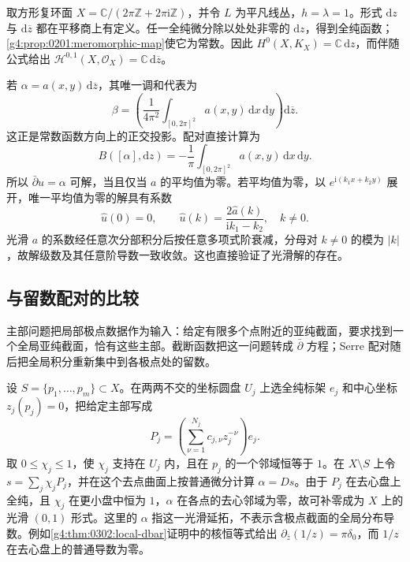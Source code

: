 \begin{example}
	\label{g4:exm:0303:flat-torus}
	取方形复环面 \(X=\mathbb C/(2\pi\mathbb Z+2\pi\mathrm{i}\mathbb Z)\)，并令 \(L\) 为平凡线丛，\(h=\lambda=1\)。形式 \(\mathrm{d}z\) 与 \(\mathrm{d}\overline z\) 都在平移商上有定义。任一全纯微分除以处处非零的 \(\mathrm{d}z\)，得到全纯函数；\cref{g4:prop:0201:meromorphic-map}使它为常数。因此 \(H^0(X,K_X)=\mathbb C\,\mathrm{d}z\)，而伴随公式给出 \(\mathscr H^{0,1}(X,\mathcal O_X)=\mathbb C\,\mathrm{d}\overline z\)。

	若 \(\alpha=a(x,y)\,\mathrm{d}\overline z\)，其唯一调和代表为
	\[
		\beta=\left(\frac1{4\pi^2}
		\int_{[0,2\pi]^2}a(x,y)\,\mathrm{d}x\,\mathrm{d}y\right)
		\mathrm{d}\overline z.
	\]
	这正是常数函数方向上的正交投影。配对直接计算为
	\[
		B([\alpha],\mathrm{d}z)
		=-\frac1\pi\int_{[0,2\pi]^2}a(x,y)\,
		\mathrm{d}x\,\mathrm{d}y.
	\]
	所以 \(\bar\partial u=\alpha\) 可解，当且仅当 \(a\) 的平均值为零。若平均值为零，以 \(e^{\mathrm{i}(k_1x+k_2y)}\) 展开，唯一平均值为零的解具有系数
	\[
		\widehat u(0)=0,\qquad
		\widehat u(k)=\frac{2\widehat a(k)}{\mathrm{i}k_1-k_2},
		\quad k\ne0.
	\]
	光滑 \(a\) 的系数经任意次分部积分后按任意多项式阶衰减，分母对 \(k\ne0\) 的模为 \(|k|\)，故解级数及其任意阶导数一致收敛。这也直接验证了光滑解的存在。
\end{example}

\subsection{与留数配对的比较}
\label{g4:subsec:0303:05}
主部问题把局部极点数据作为输入：给定有限多个点附近的亚纯截面，要求找到一个全局亚纯截面，恰有这些主部。截断函数把这一问题转成 \(\bar\partial\) 方程；Serre 配对随后把全局积分重新集中到各极点处的留数。

\ProseParagraphBreak

设 \(S=\{p_1,\ldots,p_m\}\subset X\)。在两两不交的坐标圆盘 \(U_j\) 上选全纯标架 \(e_j\) 和中心坐标 \(z_j(p_j)=0\)，把给定主部写成
\[
	P_j=\left(\sum_{\nu=1}^{N_j}c_{j,\nu}z_j^{-\nu}\right)e_j.
\]
取 \(0\le\chi_j\le1\)，使 \(\chi_j\) 支持在 \(U_j\) 内，且在 \(p_j\) 的一个邻域恒等于 \(1\)。在 \(X\setminus S\) 上令 \(s=\sum_j\chi_jP_j\)，并在这个去点曲面上按普通微分计算 \(\alpha=Ds\)。由于 \(P_j\) 在去心盘上全纯，且 \(\chi_j\) 在更小盘中恒为 \(1\)，\(\alpha\) 在各点的去心邻域为零，故可补零成为 \(X\) 上的光滑 \((0,1)\) 形式。这里的 \(\alpha\) 指这一光滑延拓，不表示含极点截面的全局分布导数。例如\cref{g4:thm:0302:local-dbar}证明中的核恒等式给出 \(\partial_{\overline z}(1/z)=\pi\delta_0\)，而 \(1/z\) 在去心盘上的普通导数为零。

